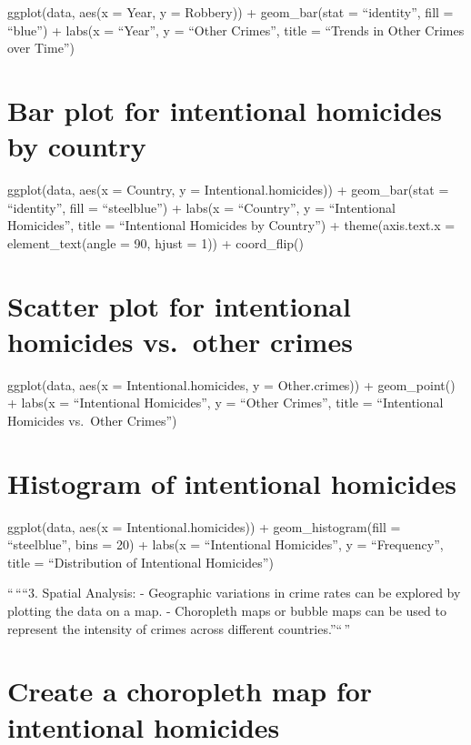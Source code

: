 \documentclass[
]{article}
\begin{document}
ggplot(data, aes(x = Year, y = Robbery)) + geom\_bar(stat =
``identity'', fill = ``blue'') + labs(x = ``Year'', y = ``Other
Crimes'', title = ``Trends in Other Crimes over Time'')

\hypertarget{bar-plot-for-intentional-homicides-by-country}{%
\section{Bar plot for intentional homicides by
country}\label{bar-plot-for-intentional-homicides-by-country}}

ggplot(data, aes(x = Country, y = Intentional.homicides)) +
geom\_bar(stat = ``identity'', fill = ``steelblue'') + labs(x =
``Country'', y = ``Intentional Homicides'', title = ``Intentional
Homicides by Country'') + theme(axis.text.x = element\_text(angle = 90,
hjust = 1)) + coord\_flip()

\hypertarget{scatter-plot-for-intentional-homicides-vs.-other-crimes}{%
\section{Scatter plot for intentional homicides vs.~other
crimes}\label{scatter-plot-for-intentional-homicides-vs.-other-crimes}}

ggplot(data, aes(x = Intentional.homicides, y = Other.crimes)) +
geom\_point() + labs(x = ``Intentional Homicides'', y = ``Other
Crimes'', title = ``Intentional Homicides vs.~Other Crimes'')

\hypertarget{histogram-of-intentional-homicides}{%
\section{Histogram of intentional
homicides}\label{histogram-of-intentional-homicides}}

ggplot(data, aes(x = Intentional.homicides)) + geom\_histogram(fill =
``steelblue'', bins = 20) + labs(x = ``Intentional Homicides'', y =
``Frequency'', title = ``Distribution of Intentional Homicides'')

``\,````3. Spatial Analysis: - Geographic variations in crime rates can
be explored by plotting the data on a map. - Choropleth maps or bubble
maps can be used to represent the intensity of crimes across different
countries.''``\,''

\hypertarget{create-a-choropleth-map-for-intentional-homicides}{%
\section{Create a choropleth map for intentional
homicides}\label{create-a-choropleth-map-for-intentional-homicides}}
\end{document}
